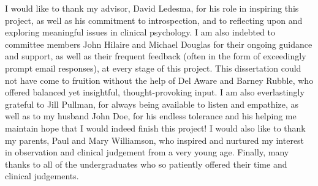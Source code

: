 I would like to thank my advisor, David Ledesma, for his role in inspiring this project, as well as his commitment to introspection, and to reflecting upon and exploring meaningful issues in clinical psychology. I am also indebted to committee members John Hilaire and Michael Douglas for their ongoing guidance and support, as well as their frequent feedback (often in the
form of exceedingly prompt email responses), at every stage of this project. This dissertation could not have come to fruition without the help of Del Aware and Barney Rubble, who offered balanced yet insightful, thought-provoking input. I am also everlastingly grateful to Jill Pullman, for always being available to listen and empathize, as well as to my husband John Doe, for his endless tolerance and his helping me maintain hope that I would indeed finish this project! I would also like to thank my parents, Paul
and Mary Williamson, who inspired and nurtured my interest in observation and clinical judgement from a very young age. Finally, many thanks to all of the undergraduates who so patiently offered their time and clinical judgements.